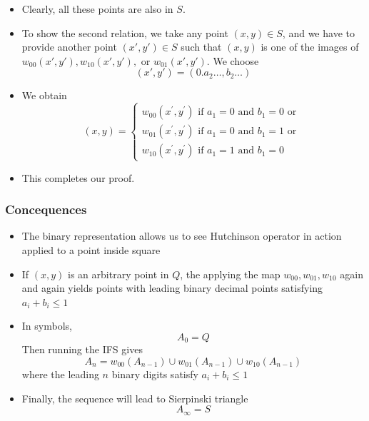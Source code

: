 \documentclass{beamer}
\begin{document}
\begin{frame}
    \begin{itemize}
        \item Clearly, all these points are also in $S$.
        \item To show the second relation, we take any point $(x,y) \in S$, and we have to provide another point $(x',y') \in S$ such that $(x,y)$ is one of the images of $w_{00}(x',y'),w_{10}(x',y'),$ or $w_{01}(x',y')$. We choose 
        \begin{equation*}
            (x',y') = (0.a_2\dots,b_2\dots)
        \end{equation*}
        \item We obtain 
        \begin{equation*}
            (x, y)=\left\{\begin{array}{l}{w_{00}\left(x^{\prime}, y^{\prime}\right) \text { if } a_{1}=0 \text { and } b_{1}=0 \text { or }} \\ {w_{01}\left(x^{\prime}, y^{\prime}\right) \text { if } a_{1}=0 \text { and } b_{1}=1 \text { or }} \\ {w_{10}\left(x^{\prime}, y^{\prime}\right) \text { if } a_{1}=1 \text { and } b_{1}=0}\end{array}\right.
        \end{equation*}
        \item This completes our proof.
    \end{itemize}
\end{frame}

\begin{frame}
    \frametitle{Concequences}
    \begin{itemize}
        \item The binary representation allows us to see Hutchinson operator in action applied to a point inside square
        \item If $(x,y)$ is an arbitrary point in $Q$, the applying the map $w_{00},w_{01},w_{10}$ again and again yields points with leading binary decimal points satisfying $a_i + b_i \leq 1$
        \item In symbols,
        \begin{equation*}
            A_0 = Q
        \end{equation*} 
        Then running the IFS gives 
        \begin{equation*}
            A_n = w_{00}(A_{n-1}) \cup w_{01}(A_{n-1}) \cup w_{10}(A_{n-1})
        \end{equation*}
        where the leading $n$ binary digits satisfy $a_i + b_i \leq 1$
        \item Finally, the sequence will lead to Sierpinski triangle
        \begin{equation*}
            A_\infty = S
        \end{equation*}
    \end{itemize}
\end{frame}
\end{document}
